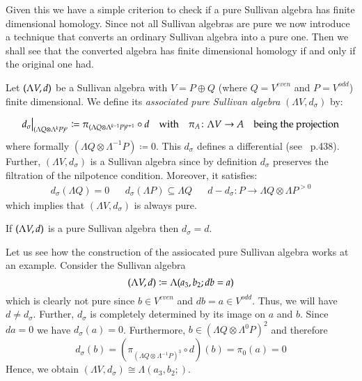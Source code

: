 Given this we have a simple criterion to check if a pure Sullivan algebra has finite dimensional
homology. 
Since not all Sullivan algebras are pure we  now introduce a technique that converts an ordinary Sullivan algebra
into a pure one. Then we shall see that the converted algebra has finite dimensional homology if and only if the original one had.

\begin{Definition}
 Let $(\Lambda V,d)$ be a Sullivan algebra with $V = P \oplus Q$ (where $Q = V^{even}$ and $P = V^{odd}$)
 finite dimensional. We define its 
 \emph{associated pure Sullivan algebra} $(\Lambda V, d_{\sigma})$ by:
  
 \begin{align*}\restr{d_{\sigma}}{(\Lambda Q \otimes \Lambda^k P)^p} \coloneqq \pi_{
 (\Lambda Q \otimes \Lambda^{k-1} P)^{p+1}} \circ d 
 & &\text{with} \quad \pi_A \colon \Lambda V \to A \quad \text{being the projection} \\
 \end{align*}
 where formally $(\Lambda Q \otimes \Lambda^{-1} P) \coloneqq 0$. 
 This $d_{\sigma}$ defines a differential (see~\cite{Felix2001} p.438). Further, $(\Lambda V, d_{\sigma})$ 
 is a Sullivan algebra since by definition $d_{\sigma}$ preserves the filtration of the 
 nilpotence condition. Moreover, it satisfies:
 \begin{align*}
  d_{\sigma}(\Lambda Q) = 0 & & d_{\sigma}(\Lambda P) \subseteq \Lambda Q & & 
  d - d_{\sigma} \colon P \to \Lambda Q \otimes \Lambda P^{> 0}
 \end{align*}
  which implies that $(\Lambda V, d_{\sigma})$ is always pure.
 
 \end{Definition}

 \begin{Remark}
  If $(\Lambda V,d)$ is a pure Sullivan algebra then $d_{\sigma} = d$.
 \end{Remark}

 
 \begin{Example}
 \label{ex:AssociatedNotMinimalSullivanAlgebra}
  Let us see how the construction of the assiocated pure Sullivan algebra works at an example. 
  Consider the Sullivan algebra $$(\Lambda V,d) \coloneqq \Lambda( a_3, b_2 ; db = a)$$ which is clearly not pure since
  $b \in V^{even}$ and $db = a \in V^{odd}$. Thus, we will have $d \neq d_{\sigma}$.
  Further, $d_{\sigma}$ is completely determined by
  its image on $a$ and $b$. Since $da = 0$ we have $d_{\sigma} (a) = 0$. Furthermore,
  $b \in (\Lambda Q \otimes \Lambda^0 P)^2$ and therefore 
  $$d_{\sigma} (b) = (\pi_{ (\Lambda Q \otimes \Lambda^{-1} P)^{3}} \circ d) (b) = \pi_0 (a) = 0$$
  Hence, we obtain $(\Lambda V, d_{\sigma}) \cong \Lambda(a_3, b_2;)$.
  \end{Example}

